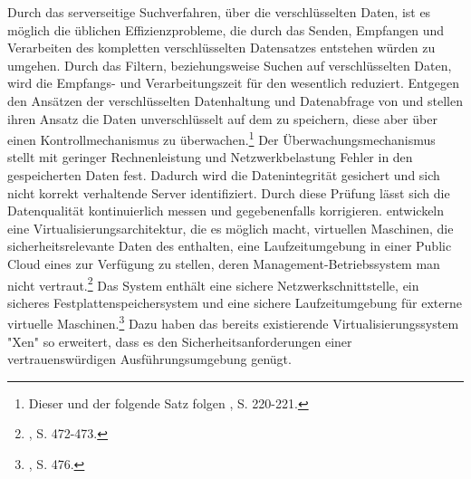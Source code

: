 Durch das serverseitige Suchverfahren, über die verschlüsselten Daten, ist es möglich die üblichen Effizienzprobleme, die durch das Senden, Empfangen und Verarbeiten des kompletten verschlüsselten Datensatzes entstehen würden zu umgehen. 
Durch das Filtern, beziehungsweise Suchen auf verschlüsselten Daten, wird die Empfangs- und Verarbeitungszeit für den \CSU wesentlich reduziert.
\newline
Entgegen den Ansätzen der verschlüsselten Datenhaltung und Datenabfrage von \cite{Suciu.2012} und \cite{Yu.2013} stellen \cite{Wang.2012} ihren Ansatz die Daten unverschlüsselt auf dem \CS zu speichern, diese aber über einen Kontrollmechanismus zu überwachen.\footnote{Dieser und der folgende Satz folgen \cite{Wang.2012}, S. 220-221.}
Der Überwachungsmechanismus stellt mit geringer Rechnenleistung und Netzwerkbelastung Fehler in den gespeicherten Daten fest. Dadurch wird die Datenintegrität gesichert und sich nicht korrekt verhaltende Server identifiziert. Durch diese Prüfung lässt sich die Datenqualität kontinuierlich messen und gegebenenfalls korrigieren.
\newline
\cite{Li.2012} entwickeln eine Virtualisierungsarchitektur, die es möglich macht, virtuellen Maschinen, die sicherheitsrelevante Daten des \CSUs enthalten, eine Laufzeitumgebung in einer Public Cloud eines \CSPs zur Verfügung zu stellen, deren Management-Betriebssystem man nicht vertraut.\footnote{\cite{Li.2012}, S. 472-473.}\saveFN{\Li}
Das System enthält eine sichere Netzwerkschnittstelle, ein sicheres Festplattenspeichersystem und eine sichere Laufzeitumgebung für externe virtuelle Maschinen.\footnote{\cite{Li.2012}, S. 476.} Dazu haben \cite{Li.2012} das bereits existierende Virtualisierungssystem "Xen" so erweitert, dass es den Sicherheitsanforderungen einer vertrauenswürdigen Ausführungsumgebung genügt.\useFN{\Li}

%
%
